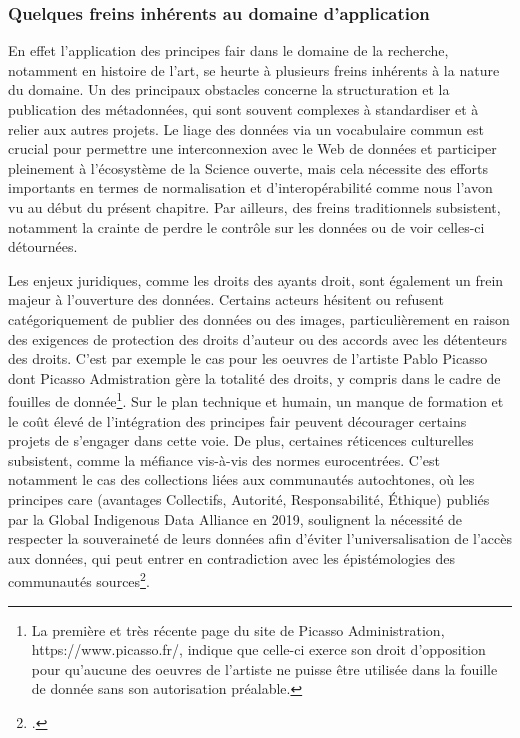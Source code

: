 \subsubsection{Quelques freins inhérents au domaine d'application}
En effet l'application des principes  \acrshort{fair} dans le domaine de la recherche, notamment en histoire de l’art, se heurte à plusieurs freins inhérents à la nature du domaine. Un des principaux obstacles concerne la structuration et la publication des métadonnées, qui sont souvent complexes à standardiser et à relier aux autres projets. Le liage des données via un vocabulaire commun est crucial pour permettre une interconnexion avec le Web de données et participer pleinement à l’écosystème de la Science ouverte, mais cela nécessite des efforts importants en termes de normalisation et d’interopérabilité comme nous l'avon vu au début du présent chapitre. Par ailleurs, des freins traditionnels subsistent, notamment la crainte de perdre le contrôle sur les données ou de voir celles-ci détournées. 

Les enjeux juridiques, comme les droits des ayants droit, sont également un frein majeur à l’ouverture des données. Certains acteurs hésitent ou refusent catégoriquement de publier des données ou des images, particulièrement en raison des exigences de protection des droits d’auteur ou des accords avec les détenteurs des droits. C'est par exemple le cas pour les oeuvres de l'artiste Pablo Picasso dont Picasso Admistration gère la totalité des droits, y compris dans le cadre de fouilles de donnée\footnote{La première et très récente page du site de Picasso Administration, https://www.picasso.fr/, indique que celle-ci exerce son droit d'opposition pour qu'aucune des oeuvres de l'artiste ne puisse être utilisée dans la fouille de donnée sans son autorisation préalable.}. Sur le plan technique et humain, un manque de formation et le coût élevé de l’intégration des principes  \acrshort{fair} peuvent décourager certains projets de s’engager dans cette voie. De plus, certaines réticences culturelles subsistent, comme la méfiance vis-à-vis des normes eurocentrées. C'est notamment le cas des collections liées aux communautés autochtones, où les principes \acrshort{care} (avantages Collectifs, Autorité, Responsabilité, Éthique) publiés par la Global Indigenous Data Alliance en 2019, soulignent la nécessité de respecter la souveraineté de leurs données afin d'éviter l’universalisation de l’accès aux données, qui peut entrer en contradiction avec les épistémologies des communautés sources\footcite{REDDENSouverainete2023}.

